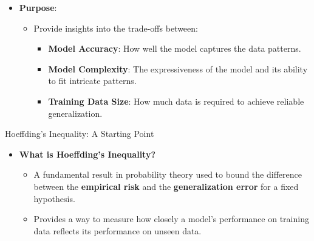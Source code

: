 \documentclass[
  ignorenonframetext,
]{beamer}
\providecommand{\tightlist}{%
  \setlength{\itemsep}{0pt}\setlength{\parskip}{0pt}}\usepackage{longtable,booktabs,array}
\begin{document}
\begin{frame}
\begin{itemize}
\tightlist
\item
  \textbf{Purpose}:

  \begin{itemize}
  \tightlist
  \item
    Provide insights into the trade-offs between:

    \begin{itemize}
    \tightlist
    \item
      \textbf{Model Accuracy}: How well the model captures the data
      patterns.
    \item
      \textbf{Model Complexity}: The expressiveness of the model and its
      ability to fit intricate patterns.
    \item
      \textbf{Training Data Size}: How much data is required to achieve
      reliable generalization.
    \end{itemize}
  \end{itemize}
\end{itemize}
\end{frame}

\begin{frame}{Hoeffding's Inequality: A Starting Point}
\label{hoeffdings-inequality-a-starting-point}
\begin{itemize}
\tightlist
\item
  \textbf{What is Hoeffding's Inequality?}

  \begin{itemize}
  \tightlist
  \item
    A fundamental result in probability theory used to bound the
    difference between the \textbf{empirical risk} and the
    \textbf{generalization error} for a fixed hypothesis.
  \item
    Provides a way to measure how closely a model's performance on
    training data reflects its performance on unseen data.
  \end{itemize}
\end{itemize}
\end{frame}
\end{document}
